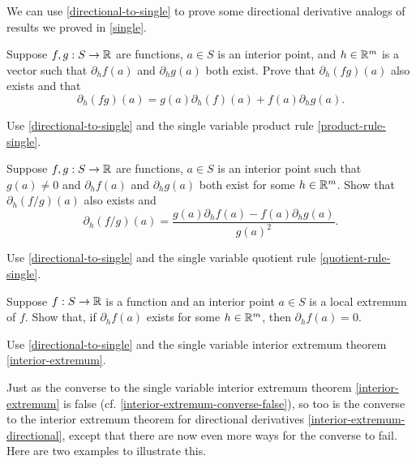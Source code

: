 We can use \cref{directional-to-single} to prove some directional derivative analogs of results we proved in \cref{single}.

\begin{exercise} \label{product-rule-directional} 
	Suppose $f, g : S \to \mathbb{R}$ are functions, $a \in S$ is an interior point, and $h \in \mathbb{R}^m$ is a vector such that $\partial_h f(a)$ and $\partial_h g(a)$ both exist. Prove that $\partial_h (fg)(a)$ also exists and that
	\[ \partial_h (fg)(a) = g(a)\partial_h(f)(a) + f(a) \partial_h g(a). \]
	\begin{hint} 
		Use \cref{directional-to-single} and the single variable product rule \ref{product-rule-single}.
	\end{hint}
\end{exercise}

\begin{exercise} \label{quotient-rule-directional} 
	Suppose $f, g : S \to \mathbb{R}$ are functions, $a \in S$ is an interior point such that $g(a) \neq 0$ and $\partial_h f(a)$ and $\partial_h g(a)$ both exist for some $h \in \mathbb{R}^m$. Show that $\partial_h(f/g)(a)$ also exists and 
	\[ \partial_h(f/g)(a) = \frac{g(a)\partial_h f(a) - f(a)\partial_h g(a)}{g(a)^2}. \]
	\begin{hint} Use \cref{directional-to-single} and the single variable quotient rule \ref{quotient-rule-single}. \end{hint} 
\end{exercise}

\begin{exercise} \label{interior-extremum-directional} 
	Suppose $f : S \to \mathbb{R}$ is a function and an interior point $a \in S$ is a local extremum of $f$. Show that, if $\partial_h f(a)$ exists for some $h \in \mathbb{R}^m$, then $\partial_h f(a) = 0$. 
	\begin{hint} Use \cref{directional-to-single} and the single variable interior extremum theorem \ref{interior-extremum}. \end{hint}
\end{exercise}

Just as the converse to the single variable interior extremum theorem \ref{interior-extremum} is false (cf. \cref{interior-extremum-converse-false}), so too is the converse to the interior extremum theorem for directional derivatives \ref{interior-extremum-directional}, except that there are now even more ways for the converse to fail. Here are two examples to illustrate this.  

